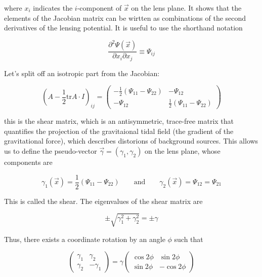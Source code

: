 where $x_i$ indicates the $i$-component of $\vec{x}$ on the lens plane. It shows that the elements of the Jacobian matrix can be wirtten as combinations of the second derivatives of the lensing potential. It is useful to use the shorthand notation

\begin{equation}
\frac{\partial^{2}\Psi(\vec{x})}{\partial x_{i}\partial x_{j}}\equiv\Psi_{ij}
\end{equation}

Let's split off an isotropic part from the Jacobian:

\begin{equation}
\left(A-\frac{1}{2}\text{tr}A\cdot I\right)_{ij}=\left(\begin{array}{cc}
-\frac{1}{2}\left(\Psi_{11}-\Psi_{22}\right) & -\Psi_{12}\\
-\Psi_{12} & \frac{1}{2}\left(\Psi_{11}-\Psi_{22}\right)
\end{array}\right)
\end{equation}

this is the shear matrix, which is an antisymmetric, trace-free matrix that quantifies the projection of the gravitaional tidal field (the gradient of the gravitational force), which describes distorions of background sources.  This allows us to define the pseudo-vector $\vec{\gamma}=(\gamma_1 , \gamma_2)$ on the lens plane, whose components are

\begin{equation}
\gamma_1(\vec{x})=\frac{1}{2}(\Psi_{11}-\Psi_{22})\qquad \text{and} \qquad \gamma_2(\vec{x})=\Psi_{12} = \Psi_{21}
\end{equation}

This is called the shear. The eigenvalues of the shear matrix are 

\begin{equation}
\pm \sqrt{\gamma_1^2 + \gamma_2^2} = \pm \gamma
\end{equation}

Thus, there exists a coordinate rotation by an angle $\phi$ such that 

\begin{equation}
\left(\begin{array}{cc}
\gamma_{1} & \gamma_{2}\\
\gamma_{2} & -\gamma_{1}
\end{array}\right)=\gamma\left(\begin{array}{cc}
\cos2\phi & \sin2\phi\\
\sin2\phi & -\cos2\phi
\end{array}\right)
\end{equation}

